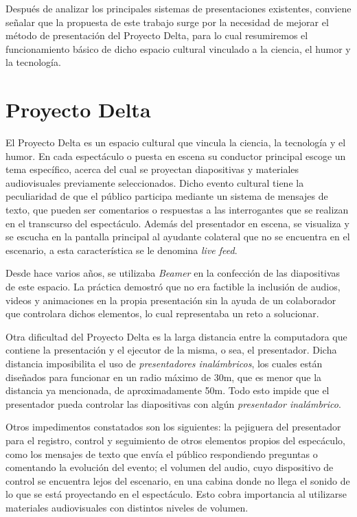
		Después de analizar los principales sistemas de presentaciones existentes, conviene señalar que la propuesta de este trabajo surge por la necesidad de mejorar el método de presentación del Proyecto Delta, para lo cual resumiremos el funcionamiento básico de dicho espacio cultural vinculado a la ciencia, el humor y la tecnología.

	\section{Proyecto Delta} %
	\label{sec:proyecto_delta}

			El Proyecto Delta es un espacio cultural que vincula la ciencia, la tecnología y el humor. En cada espectáculo o puesta en escena su conductor principal escoge un tema específico, acerca del cual se proyectan diapositivas y materiales audiovisuales previamente seleccionados. Dicho evento cultural tiene la peculiaridad de que el público participa mediante un sistema de mensajes de texto, que pueden ser comentarios o respuestas a las interrogantes que se realizan en el transcurso del espectáculo. Además del presentador en escena, se visualiza y se escucha en la pantalla principal al ayudante colateral que no se encuentra en el escenario, a esta característica se le denomina \textit{live feed}.


			Desde hace varios años, se utilizaba \textit{Beamer} en la confección de las diapositivas de este espacio. La práctica demostró que no era factible la inclusión de audios, videos y animaciones en la propia presentación sin la ayuda de un colaborador que controlara dichos elementos, lo cual representaba un reto a solucionar.	


			Otra dificultad del Proyecto Delta es la larga distancia entre la computadora que contiene la presentación y el ejecutor de la misma, o sea, el presentador. Dicha distancia imposibilita el uso de \textit{presentadores inalámbricos}, los cuales están diseñados para funcionar en un radio máximo de 30m, que es menor que la distancia ya mencionada, de aproximadamente 50m. Todo esto impide que el presentador pueda controlar las diapositivas con algún \textit{presentador inalámbrico}.

			Otros impedimentos constatados son los siguientes: la pejiguera del presentador para el registro, control y seguimiento de otros elementos propios del especáculo, como los mensajes de texto que envía el público respondiendo preguntas o comentando la evolución del evento; el volumen del audio, cuyo dispositivo de control se encuentra lejos del escenario, en una cabina donde no llega el sonido de lo que se está proyectando en el espectáculo. Esto cobra importancia al utilizarse materiales audiovisuales con distintos niveles de volumen.

